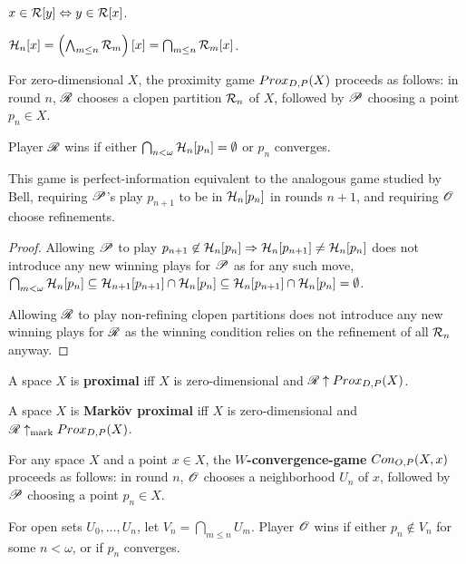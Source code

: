 \begin{proposition}
  $x\in \mathcal{R}[y] \Leftrightarrow y\in \mathcal{R}[x]$.

  $\mathcal{H}_n[x]=\left(\bigwedge_{m\leq n} \mathcal{R}_m\right)[x]=\bigcap_{m\leq n}\mathcal{R}_m[x]$.
\end{proposition}

\begin{definition}
  For zero-dimensional $X$, the proximity game $Prox_{D,P}(X)$ proceeds as follows: in round $n$, $\mathscr{R}$ chooses a clopen partition $\mathcal{R}_n$ of $X$, followed by $\mathscr{P}$ choosing a point $p_n\in X$.

  Player $\mathscr{R}$ wins if either $\bigcap_{n<\omega} \mathcal{H}_n[p_n] = \emptyset$ or $p_n$ converges.
\end{definition}

\begin{proposition}
  This game is perfect-information equivalent to the analogous game studied by Bell, requiring $\mathscr{P}$'s play $p_{n+1}$ to be in $\mathcal{H}_n[p_n]$ in rounds $n+1$, and requiring $\mathscr{O}$ choose refinements.
\end{proposition}

\begin{proof}
  Allowing $\mathscr{P}$ to play $p_{n+1}\not\in \mathcal{H}_n[p_n]\Rightarrow \mathcal{H}_n[p_{n+1}]\not=\mathcal{H}_n[p_n]$ does not introduce any new winning plays for $\mathscr{P}$ as for any such move, $\bigcap_{m<\omega}\mathcal{H}_n[p_n]\subseteq \mathcal{H}_{n+1}[p_{n+1}]\cap \mathcal{H}_n[p_n]\subseteq \mathcal{H}_n[p_{n+1}]\cap \mathcal{H}_n[p_n]=\emptyset$.

  Allowing $\mathscr{R}$ to play non-refining clopen partitions does not introduce any new winning plays for $\mathscr{R}$ as the winning condition relies on the refinement of all $\mathcal{R}_n$ anyway.
\end{proof}

\begin{definition}
  A space $X$ is \textbf{proximal} iff $X$ is zero-dimensional and $\mathscr{R}\uparrow Prox_{D,P}(X)$.
\end{definition}

\begin{definition}
  A space $X$ is \textbf{Mark\"ov proximal} iff $X$ is zero-dimensional and $\mathscr{R}\uparrow_{\text{mark}}Prox_{D,P}(X)$.
\end{definition}

\begin{definition}
  For any space $X$ and a point $x\in X$, the \textbf{$W$-convergence-game} $Con_{O,P}(X,x)$ proceeds as follows: in round $n$, $\mathscr{O}$ chooses a neighborhood $U_n$ of $x$, followed by $\mathscr{P}$ choosing a point $p_n\in X$.

  For open sets $U_0,\dots,U_n$, let $V_n=\bigcap_{m\leq n} U_m$. Player $\mathscr{O}$ wins if either $p_n\not\in V_n$ for some $n<\omega$, or if $p_n$ converges.
\end{definition}

